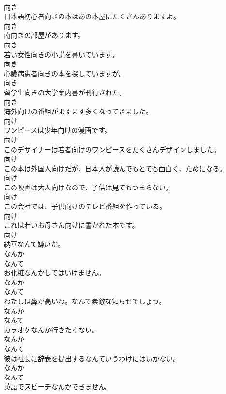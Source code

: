 \documentclass[8pt]{extreport}
\begin{document}
\begin{CJK}{UTF8}{min}
\\	向き
\\	日本語初心者向きの本はあの本屋にたくさんありますよ。	
\\	向き
\\	南向きの部屋があります。	
\\	向き
\\	若い女性向きの小説を書いています。	
\\	向き
\\	心臓病患者向きの本を探していますが。	
\\	向き
\\	留学生向きの大学案内書が刊行された。	
\\	向き
\\	海外向けの番組がますます多くなってきました。	
\\	向け
\\	ワンピースは少年向けの漫画です。	
\\	向け
\\	このデザイナーは若者向けのワンピースをたくさんデザインしました。	
\\	向け
\\	この本は外国人向けだが、日本人が読んでもとても面白く、ためになる。	
\\	向け
\\	この映画は大人向けなので、子供は見てもつまらない。	
\\	向け
\\	この会社では、子供向けのテレビ番組を作っている。	
\\	向け
\\	これは若いお母さん向けに書かれた本です。	
\\	向け
\\	納豆なんて嫌いだ。	
\\	なんか 
\\	なんて
\\	お化粧なんかしてはいけません。	
\\	なんか 
\\	なんて
\\	わたしは鼻が高いわ。なんて素敵な知らせでしょう。	
\\	なんか 
\\	なんて
\\	カラオケなんか行きたくない。	
\\	なんか 
\\	なんて
\\	彼は社長に辞表を提出するなんていうわけにはいかない。	
\\	なんか 
\\	なんて
\\	英語でスピーチなんかできません。	

\end{CJK}
\end{document}
